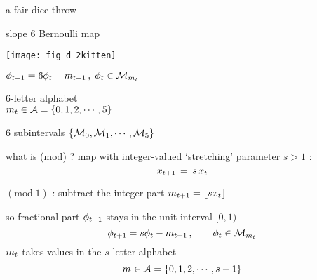 
\renewcommand{\statesp}{phase space}

\begin{frame}{a fair dice throw}
    \begin{block}{slope ${6}$ Bernoulli map}
\begin{center}
            \begin{minipage}[c]{0.32\textwidth}\begin{center}
\texttt{[image: fig\_d\_2kitten]} %
            \end{center}\end{minipage}
            \hspace{2ex}
            \begin{minipage}[c]{0.46\textwidth}
\(
\ssp_{\zeit+1}
= {6} \ssp_{\zeit} - \Ssym{\zeit+1}
\,,\;  \ssp_{\zeit}\in\pS_{\Ssym{\zeit}}
\)
\medskip

${6}$-letter alphabet \\
\(
{m_{t}} \in \mathcal{A}=\{0,1,2,\cdots,5\}
\)
            \end{minipage}
\end{center}
$6$ subintervals $\{{\cal M}_{0},{\cal M}_{1},\cdots,{\cal M}_{5}\}$
    \end{block}
\end{frame} %

\begin{frame}{what is ({mod}) ?}
\renewcommand{\ssp}{\ensuremath{x}}             %
map with integer-valued {\color{blue}`stretching' parameter $s>1$} :
\[
\ssp_{\zeit+1} \,=\, {s}\,\ssp_{\zeit}
\] %

$(\mbox{mod}\;1)$ :
subtract the integer part
\(
\Ssym{\zeit+1}=\left\lfloor{s}\ssp_{\zeit}\right\rfloor
\)

\renewcommand{\ssp}{\ensuremath{\phi}}             %
so fractional part
$\ssp_{\zeit+1}$ stays in the unit interval $[0,1)$
\[
\ssp_{\zeit+1}
= {s} \ssp_{\zeit} - \Ssym{\zeit+1}
\,,\qquad  \ssp_{\zeit}\in\pS_{\Ssym{\zeit}}
\] %
${m_{t}}$ takes values in the ${s}$-letter alphabet
\[
{m_{}} \in \mathcal{A}=\{0,1,2,\cdots,s-1\}
\] %
\end{frame} %

